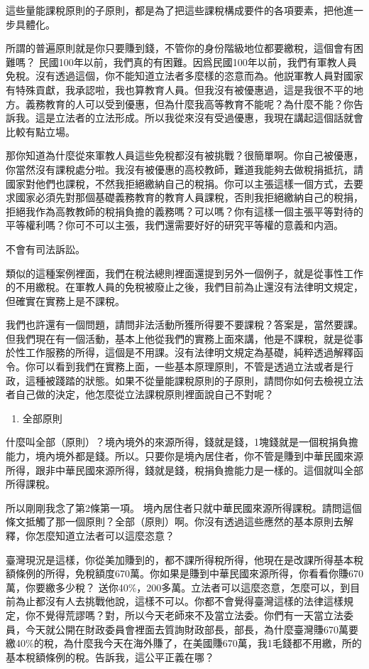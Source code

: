 \documentclass[]{ctexbook}
\providecommand{\tightlist}{%
  \setlength{\itemsep}{0pt}\setlength{\parskip}{0pt}}
\begin{document}
這些量能課稅原則的子原則，都是為了把這些課稅構成要件的各項要素，把他進一步具體化。

所謂的普遍原則就是你只要賺到錢，不管你的身份階級地位都要繳稅，這個會有困難嗎？ 民國100年以前，我們真的有困難。因爲民國100年以前，我們有軍教人員免稅。沒有透過這個，你不能知道立法者多麼樣的恣意而為。他説軍教人員對國家有特殊貢獻，我承認啦，我也算教育人員。但我沒有被優惠過，這是我很不平的地方。義務教育的人可以受到優惠，但為什麼我高等教育不能呢？為什麼不能？你告訴我。這是立法者的立法形成。所以我從來沒有受過優惠，我現在講起這個話就會比較有點立場。

那你知道為什麼從來軍教人員這些免稅都沒有被挑戰？很簡單啊。你自己被優惠，你當然沒有課稅處分啦。我沒有被優惠的高校教師，難道我能夠去做稅捐抵抗，請國家對他們也課稅，不然我拒絕繳納自己的稅捐。你可以主張這樣一個方式，去要求國家必須先對那個基礎義務教育的教育人員課稅，否則我拒絕繳納自己的稅捐，拒絕我作為高教教師的稅捐負擔的義務嗎？可以嗎？你有這樣一個主張平等對待的平等權利嗎？你可不可以主張，我們還需要好好的研究平等權的意義和内涵。

不會有司法訴訟。

類似的這種案例裡面，我們在稅法總則裡面還提到另外一個例子，就是從事性工作的不用繳稅。在軍教人員的免稅被廢止之後，我們目前為止還沒有法律明文規定，但確實在實務上是不課稅。

我們也許還有一個問題，請問非法活動所獲所得要不要課稅？答案是，當然要課。但我們現在有一個活動，基本上他從我們的實務上面來講，他是不課稅，就是從事於性工作服務的所得，這個是不用課。沒有法律明文規定為基礎，純粹透過解釋函令。你可以看到我們在實務上面，一些基本原理原則，不管是透過立法或者是行政，這種被踐踏的狀態。如果不從量能課稅原則的子原則，請問你如何去檢視立法者自己做的決定，他怎麼從立法課稅原則裡面說自己不對呢？

\begin{enumerate}
\def\labelenumi{\arabic{enumi}.}
\setcounter{enumi}{1}
\tightlist
\item
  全部原則
\end{enumerate}

什麼叫全部（原則）？境內境外的來源所得，錢就是錢，1塊錢就是一個稅捐負擔能力，境內境外都是錢。所以。只要你是境內居住者，你不管是賺到中華民國來源所得，跟非中華民國來源所得，錢就是錢，稅捐負擔能力是一樣的。這個就叫全部所得課稅。

所以剛剛我念了第2條第一項。
境內居住者只就中華民國來源所得課稅。請問這個條文抵觸了那一個原則？全部（原則）啊。你沒有透過這些應然的基本原則去解釋，你怎麼知道立法者可以這麼恣意？

臺灣現況是這樣，你從美加賺到的，都不課所得稅所得，他現在是改課所得基本稅額條例的所得，免稅額度670萬。你如果是賺到中華民國來源所得，你看看你賺670萬，你要繳多少稅？ 送你40\%，200多萬。立法者可以這麼恣意，怎麼可以，到目前為止都沒有人去挑戰他說，這樣不可以。你都不會覺得臺灣這樣的法律這樣規定，你不覺得荒謬嗎？對，所以今天老師來不及當立法委。你們有一天當立法委員，今天就公開在財政委員會裡面去質詢財政部長，部長，為什麼臺灣賺670萬要繳40\%的稅，為什麼我今天在海外賺了，在美國賺670萬，我1毛錢都不用繳，所的基本稅額條例的稅。告訴我，這公平正義在哪？
\end{document}

